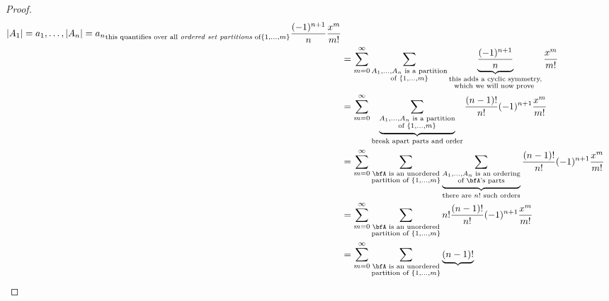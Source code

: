 \documentclass{article}
\begin{document}
\begin{proof}
\begin{align*}
{{{                    |A_1| = a_1, \ldots, |A_n| = a_n
                }
            }
        }_{\text{this quantifies over all \textit{ordered set partitions} of} \{1,\ldots,m\}}
        \frac{(-1)^{n+1}}{n}
        \frac{x^m}{m!}
        \\
        &=
        \sum_{m=0}^\infty
        \sum_{
            \substack{
                A_1,\ldots,A_n \text{ is a partition} \\
                \text{of }\{1,\ldots,m\}
            }
        }
        \underbrace{
            \frac{(-1)^{n+1}}{n}
        }_{
            \substack{
                \text{this adds a cyclic symmetry,} \\
                \text{which we will now prove }
            }
        }
        \frac{x^m}{m!}
        \\
        &=
        \sum_{m=0}^\infty
        \underbrace{
            \sum_{
                \substack{
                    A_1,\ldots,A_n \text{ is a partition} \\
                    \text{of }\{1,\ldots,m\}
                }
            }
        }_{\text{break apart parts and order}}
        \frac{(n-1)!}{n!}
        (-1)^{n+1}
        \frac{x^m}{m!}
        \\
        &=
        \sum_{m=0}^\infty
        \sum_{
            \substack{
                \bfA \text{ is an unordered} \\
                \text{partition of }\{1,\ldots,m\}
            }
        }
        \underbrace{
            \sum_{
                \substack{
                    A_1,\ldots,A_n \text{ is an ordering} \\
                    \text{of $\bfA$'s parts}
                }
            }
        }_{\text{there are $n!$ such orders}}
        \frac{(n-1)!}{n!}
        (-1)^{n+1}
        \frac{x^m}{m!}
        \\
        &=
        \sum_{m=0}^\infty
        \sum_{
            \substack{
                \bfA \text{ is an unordered} \\
                \text{partition of }\{1,\ldots,m\}
            }
        }
        n!
        \frac{(n-1)!}{n!}
        (-1)^{n+1}
        \frac{x^m}{m!}
        \\
        &=
        \sum_{m=0}^\infty
        \sum_{
            \substack{
                \bfA \text{ is an unordered} \\
                \text{partition of }\{1,\ldots,m\}
            }
        }
        \underbrace{
            (n-1)!
        }_{
}
\end{align*}
\end{proof}
\end{document}
